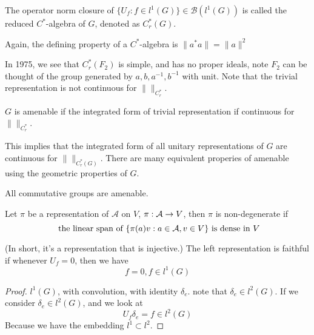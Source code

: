 \begin{definition}
    The operator norm closure of $\{U_f: f\in l^1(G)\}\in \mathcal{B}(l^1(G))$ is called the reduced $C^*$-algebra of $G$, denoted as $C_r^*(G)$.
\end{definition}
\begin{note}
    Again, the defining property of a $C^*$-algebra is $\|a^*a\|=\|a\|^2$
\end{note}
In 1975, we see that $C_r^*(F_2)$ is simple, and has no proper ideals, note $F_2$ can be thought of the group generated by $a,b, a^{-1}, b^{-1}$ with unit. Note that the trivial representation is not continuous for $\| \|_{C_r^*}$.

\begin{definition}
    $G$ is amenable if the integrated form of trivial representation if continuous for $\|\|_{C_r^*}$.
\end{definition}
\begin{remark}
    This implies that the integrated form of all unitary representations of $G$ are continuous for $\| \|_{C_r^*(G)}$. There are many equivalent properies of amenable using the geometric properties of $G$.
\end{remark}
\begin{note}
    All commutative groups are amenable.
\end{note}

\begin{definition}
    Let $\pi$ be a representation of $\mathcal{A}$ on $V$, $\pi:\mathcal{A}\to V$, then $\pi$ is non-degenerate if
    \begin{equation*}
        \text{ the linear span of }\{\pi(a)v: a\in\mathcal{A}, v\in V\} \text{ is dense in } V
    \end{equation*}
\end{definition}
\begin{definition}
    (In short, it's a representation that is injective.) The left representation is faithful if whenever $U_f=0$, then we have
    \begin{equation*}
        f=0, f\in l^1(G)
    \end{equation*}
\end{definition}
\begin{proof}
    $l^1(G)$, with convolution, with identity $\delta_e$. note that $\delta_e\in l^2(G)$. If we consider $\delta_e\in l^2(G)$, and we look at 
    \begin{equation*}
        U_f\delta_e=f\in l^2(G)
    \end{equation*}
    Because we have the embedding $l^1\subset l^2$. 
\end{proof}


